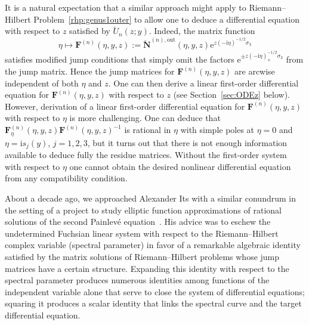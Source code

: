 \documentclass[pdftex]{sigma}
\numberwithin{equation}{section}
\begin{document}
It is a natural expectation that a similar approach might apply to Riemann--Hilbert Problem~\ref{rhp:genus1outer} to allow one to deduce a differential equation with respect to $z$ satisfied by $\breve{U}_n(z;y)$. Indeed, the matrix function
\begin{equation}
\eta\mapsto\mathbf{F}^{(n)}(\eta,y,z):=\breve{\mathbf{N}}^{(n),\mathrm{out}}(\eta,y,z)\mathrm{e}^{z(-\mathrm{i}\eta)^{-1/2}\sigma_3}
\label{eq:F-N}
\end{equation}
satisfies modified jump conditions that simply omit the factors $\mathrm{e}^{\pm z(-\mathrm{i}\eta)_{\mp}^{-1/2}\sigma_3}$ from the jump matrix. Hence the jump matrices for $\mathbf{F}^{(n)}(\eta,y,z)$ are arcwise independent of both $\eta$ and $z$. One can then derive a linear first-order differential equation for $\mathbf{F}^{(n)}(\eta,y,z)$ with respect to $z$ (see Section~\ref{sec:ODEz} below). However, derivation of a linear first-order differential equation for $\mathbf{F}^{(n)}(\eta,y,z)$ with respect to $\eta$ is more challenging. One can deduce that $\mathbf{F}^{(n)}_\eta(\eta,y,z)\mathbf{F}^{(n)}(\eta,y,z)^{-1}$ is rational in $\eta$ with simple poles at $\eta=0$ and $\eta=\mathrm{i} s_j(y)$, $j=1,2,3$, but it turns out that there is not enough information available to deduce fully the residue matrices. Without the first-order system with respect to $\eta$ one cannot obtain the desired nonlinear differential equation from any compatibility condition.

About a decade ago, we approached Alexander Its with a similar conundrum in the
setting of a project to study elliptic function approximations of rational solutions
of the second Painlev\'e equation~\cite{BuckinghamM14}. His advice was to
eschew the undetermined Fuchsian linear system with respect to the Riemann--Hilbert
complex variable (spectral parameter) in favor of a remarkable algebraic identity
satisfied by the matrix solutions of Riemann--Hilbert problems whose jump matrices
have a certain structure. Expanding this identity with respect to the spectral
parameter produces numerous identities among functions of the independent variable
alone that serve to close the system of differential equations; squaring it produces
a scalar identity that links the spectral curve and the target differential equation.
\end{document}
